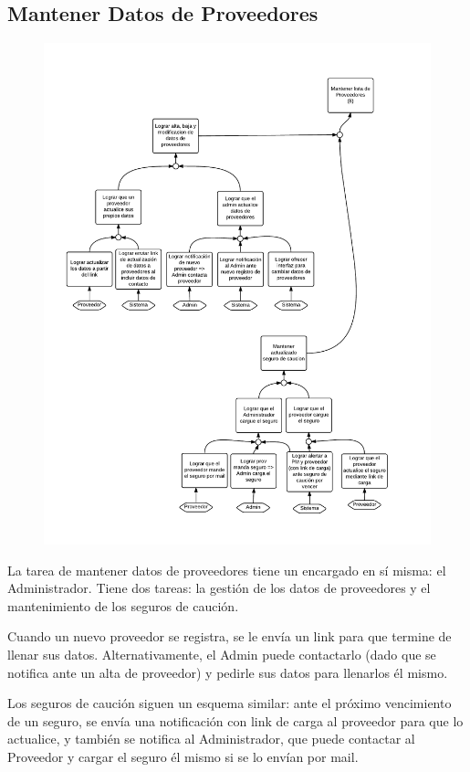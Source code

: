 \subsection{Mantener Datos de Proveedores}
\begin{figure}[H]
\includegraphics[width=\textwidth, clip=true, trim=15pt 40pt 15pt 40pt]{imagenes/objetivos/objetivos16.pdf}
\end{figure}

La tarea de mantener datos de proveedores tiene un encargado en sí misma: el Administrador.
Tiene dos tareas: la gestión de los datos de proveedores y el mantenimiento de los seguros de caución.

Cuando un nuevo proveedor se registra, se le envía un link para que termine de llenar sus datos.
Alternativamente, el Admin puede contactarlo (dado que se notifica ante un alta de proveedor) y pedirle sus datos para llenarlos él mismo.

Los seguros de caución siguen un esquema similar: ante el próximo vencimiento de un seguro, se envía una notificación con link de carga al proveedor para que lo actualice, y también se notifica al Administrador, que puede contactar al Proveedor y cargar el seguro él mismo si se lo envían por mail.

